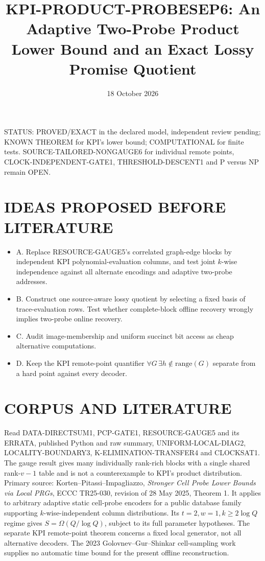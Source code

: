 \documentclass[11pt]{article}
\title{KPI-PRODUCT-PROBESEP6: An Adaptive Two-Probe Product Lower Bound and an Exact Lossy Promise Quotient}
\date{18 October 2026}
\begin{document}
\maketitle
\noindent STATUS: PROVED/EXACT in the declared model, independent review pending; KNOWN THEOREM for KPI's lower bound; COMPUTATIONAL for finite tests. SOURCE-TAILORED-NONGAUGE6 for individual remote points, CLOCK-INDEPENDENT-GATE1, THRESHOLD-DESCENT1 and P versus NP remain OPEN.

\section{IDEAS PROPOSED BEFORE LITERATURE}
\begin{itemize}
\item[] A. Replace RESOURCE-GAUGE5's correlated graph-edge blocks by independent KPI polynomial-evaluation columns, and test joint $k$-wise independence against all alternate encodings and adaptive two-probe addresses.
\item[] B. Construct one source-aware lossy quotient by selecting a fixed basis of trace-evaluation rows. Test whether complete-block offline recovery wrongly implies two-probe online recovery.
\item[] C. Audit image-membership and uniform succinct bit access as cheap alternative computations.
\item[] D. Keep the KPI remote-point quantifier $\forall G\,\exists h\notin\mathrm{range}(G)$ separate from a hard point against every decoder.
\end{itemize}

\section{CORPUS AND LITERATURE}
Read DATA-DIRECTSUM1, PCP-GATE1, RESOURCE-GAUGE5 and its ERRATA, published Python and raw summary, UNIFORM-LOCAL-DIAG2, LOCALITY-BOUNDARY3, K-ELIMINATION-TRANSFER4 and CLOCKSAT1. The gauge result gives many individually rank-rich blocks with a single shared rank-$v-1$ table and is not a counterexample to KPI's product distribution. Primary source: Korten--Pitassi--Impagliazzo, \emph{Stronger Cell Probe Lower Bounds via Local PRGs}, ECCC TR25-030, revision of 28 May 2025, Theorem 1. It applies to arbitrary adaptive static cell-probe encoders for a public database family supporting $k$-wise-independent column distributions. Its $t=2,w=1,k\ge2\log Q$ regime gives $S=\Omega(Q/\log Q)$, subject to its full parameter hypotheses. The separate KPI remote-point theorem concerns a fixed local generator, not all alternative decoders. The 2023 Golovnev--Gur--Shinkar cell-sampling work supplies no automatic time bound for the present offline reconstruction.
\end{document}
